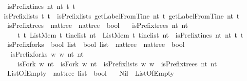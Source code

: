 \begin{isabellebody}
\ {\isachardoublequoteopen}isPrefix{\isacharunderscore}tines\ nt{}\ nt{}\ t{}\ t{}\ {\isacharequal}\ \isanewline
{\isacharparenleft}isPrefix{\isacharunderscore}lists\ t{}\ t{}\ {\isasymand}\ isPrefix{\isacharunderscore}lists\ {\isacharparenleft}getLabelFromTine\ nt{}\ t{}{\isacharparenright}\ {\isacharparenleft}getLabelFromTine\ nt{}\ t{}{\isacharparenright}{\isacharparenright}\ \ {\isachardoublequoteclose}\isanewline
\isanewline
{}\isamarkupfalse%
\ isPrefix{\isacharunderscore}trees\ {\isacharcolon}{\isacharcolon}\ {\isachardoublequoteopen}nattree\ {\isasymRightarrow}\ nattree\ {\isasymRightarrow}\ bool{\isachardoublequoteclose}\ \isanewline
\ \ {\isachardoublequoteopen}isPrefix{\isacharunderscore}trees\ nt{}\ nt{}\ {\isacharequal}\ \isanewline
\ \ \ \ {\isacharparenleft}{\isasymforall}t{}{\isachardot}\ {\isacharparenleft}{\isasymforall}t{}{\isachardot}\ ListMem\ t{}\ {\isacharparenleft}tinelist\ nt{}{\isacharparenright}\ {\isasymand}\ ListMem\ t{}\ {\isacharparenleft}tinelist\ nt{}{\isacharparenright}\ {\isasymlongrightarrow}\ isPrefix{\isacharunderscore}tines\ nt{}\ nt{}\ t{}\ t{}{\isacharparenright}{\isacharparenright}{\isachardoublequoteclose}\isanewline
\isanewline
{}\isamarkupfalse%
\ isPrefix{\isacharunderscore}forks\ {\isacharcolon}{\isacharcolon}\ {\isachardoublequoteopen}bool\ list\ {\isasymRightarrow}\ bool\ list\ {\isasymRightarrow}\ nattree\ {\isasymRightarrow}\ nattree\ {\isasymRightarrow}\ bool{\isachardoublequoteclose}\ \isanewline
\ \ {\isachardoublequoteopen}isPrefix{\isacharunderscore}forks\ w{}\ w{}\ nt{}\ nt{}\ {\isacharequal}\ \isanewline
\ \ \ \ {\isacharparenleft}isFork\ w{}\ nt{}\ {\isasymand}\ isFork\ w{}\ nt{}\ {\isasymand}\ isPrefix{\isacharunderscore}lists\ w{}\ w{}\ {\isasymand}\ isPrefix{\isacharunderscore}trees\ nt{}\ nt{}{\isacharparenright}{\isachardoublequoteclose}\isanewline
\ \ \isanewline
{}\isamarkupfalse%
\ ListOfEmpty\ {\isacharcolon}{\isacharcolon}\ {\isachardoublequoteopen}nattree\ list\ {\isasymRightarrow}\ bool{\isachardoublequoteclose}\ \isanewline
\ \ Nil\ {\isacharcolon}\ {\isachardoublequoteopen}ListOfEmpty\ {\isacharbrackleft}{\isacharbrackright}{\isachardoublequoteclose}\isanewline

\end{isabellebody}
